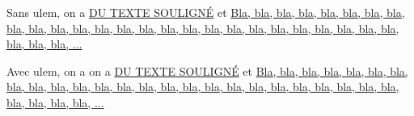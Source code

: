 \documentclass[a4paper,10pt]{article}
\begin{document}
Sans ulem, on a \underline{DU TEXTE SOULIGNÉ} et
\underline{Bla, bla, bla, bla, bla, bla, bla, bla, bla, bla, bla, bla, bla, bla, bla, bla, bla, bla, bla, bla, bla, bla, bla, bla, bla, bla, bla, bla, bla, ...}

Avec ulem, on a  on a \uline{DU TEXTE SOULIGNÉ} et
\uline{Bla, bla, bla, bla, bla, bla, bla, bla, bla, bla, bla, bla, bla, bla, bla, bla, bla, bla, bla, bla, bla, bla, bla, bla, bla, bla, bla, bla, bla, ...}
\end{document}
